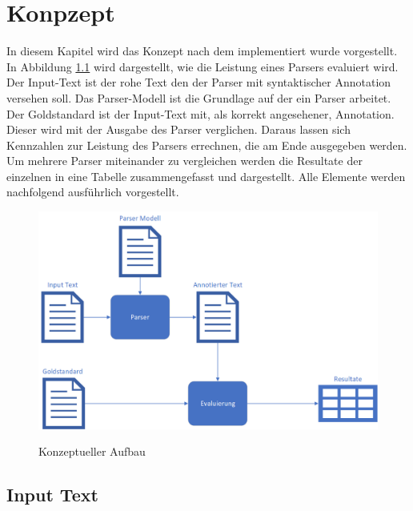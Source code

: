 %
\chapter{Konpzept}
\label{sec:konzept}

In diesem Kapitel wird das Konzept nach dem implementiert wurde vorgestellt. In Abbildung \ref{fig:konzept-aufbau} wird dargestellt, wie die Leistung eines Parsers evaluiert wird. Der Input-Text ist der rohe Text den der Parser mit syntaktischer Annotation versehen soll. Das Parser-Modell ist die Grundlage auf der ein Parser arbeitet. Der Goldstandard ist der Input-Text mit, als korrekt angesehener, Annotation. Dieser wird mit der Ausgabe des Parser verglichen. Daraus lassen sich Kennzahlen zur Leistung des Parsers errechnen, die am Ende ausgegeben werden.
Um mehrere Parser miteinander zu vergleichen werden die Resultate der einzelnen in eine Tabelle zusammengefasst und dargestellt. Alle Elemente werden nachfolgend ausführlich vorgestellt. 
\begin{figure} [h]

\includegraphics[width=\textwidth]{gfx/konzept-aufbau-png.png} 
\label{fig:konzept-aufbau}	
\caption{Konzeptueller Aufbau}	
\end{figure}
		
\section{Input Text}


